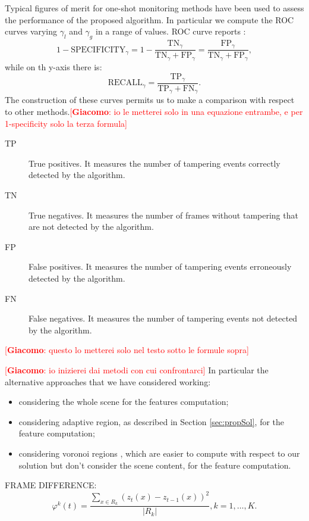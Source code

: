 \documentclass{llncs}
\newcommand{\gi}[1]{{\textcolor{red}{[\small \textbf{Giacomo}: #1]}}}
\begin{document}
Typical figures of merit for one-shot monitoring methods have been used to assess the performance of the proposed algorithm. In particular we compute the ROC curves varying $\gamma_l$ and $\gamma_g$ in a range of values. ROC curve reports :
\[1-\text{SPECIFICITY}_\gamma = 1-\frac{\text{TN}_\gamma}{\text{TN}_\gamma+\text{FP}_\gamma}=\frac{\text{FP}_\gamma}{\text{TN}_\gamma+\text{FP}_\gamma},\]
while on th y-axis there is:
\[\text{RECALL}_\gamma=\frac{\text{TP}_\gamma}{\text{TP}_\gamma+\text{FN}_\gamma}.\]
The construction of these curves permits us to make a comparison with respect to other methods.\gi{io le metterei solo in una equazione entrambe, e per 1-specificity solo la terza formula}

\begin{description}
	\item[TP]  True positives. It measures the number of tampering events correctly detected by the algorithm.\\ 
	\item[TN]  True negatives. It measures the number of frames without tampering that are not detected by the algorithm. \\ 
	\item[FP]  False positives. It measures the number of tampering events erroneously detected by the algorithm.\\ 
	\item[FN]  False negatives. It measures the number of tampering events not detected by the algorithm. \\ 
\end{description} 
\gi{questo lo metterei solo nel testo sotto le formule sopra}

\gi{io inizierei dai metodi con cui confrontarci}
In particular the alternative approaches that we have considered working:
\begin{itemize}
\item considering the whole scene for the features computation;
\item considering adaptive region, as described in Section \ref{sec:propSol}, for the feature computation;
\item considering voronoi regions \cite{aurenhammer1991voronoi}, which are easier to compute with respect to our solution but don't consider the scene content, for the feature computation.
\end{itemize}

FRAME DIFFERENCE:
\begin{equation}
	\label{eq:frameDiffReg}
	\varphi^k(t) = \frac{\sum_{x \in R_k}(z_t(x) - z_{t-1}(x))^2}{|R_k|}, k=1,\dots,K.
\end{equation}
\end{document}
